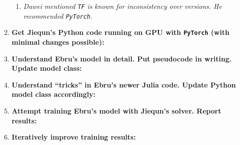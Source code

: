 \documentclass[10pt]{article}
\begin{document}
\begin{enumerate}
\begin{enumerate}
        \item[] \emph{\color{red}Dawei mentioned \texttt{TF} is known for inconsistency over versions. He recommended \texttt{PyTorch}.}
        \end{enumerate}
    \item \textbf{Get Jiequn's Python code running on GPU with \texttt{PyTorch} (with minimal changes possible):}
    \item \textbf{Understand Ebru's model in detail. Put pseudocode in writing. Update model class:}
    \item \textbf{Understand ``tricks'' in Ebru's newer Julia code. Update Python model class accordingly:}
    \item \textbf{Attempt training Ebru's model with Jiequn's solver. Report results:}
    \item \textbf{Iteratively improve training results:}
\end{enumerate}
\end{document}
